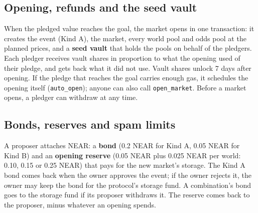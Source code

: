 \documentclass[11pt,a4paper]{article}
\newcommand{\code}[1]{\texttt{\small #1}}
\begin{document}
\subsection{Opening, refunds and the seed vault}

When the pledged value reaches the goal, the market opens in one transaction: it creates the event (Kind A), the
market, every world pool and odds pool at the planned prices, and a \textbf{seed vault} that holds the pools on
behalf of the pledgers. Each pledger receives vault shares in proportion to what the opening used of their pledge,
and gets back what it did not use. Vault shares unlock 7 days after opening. If the pledge that reaches the goal
carries enough gas, it schedules the opening itself (\code{auto\_open}); anyone can also call \code{open\_market}.
Before a market opens, a pledger can withdraw at any time.

\subsection{Bonds, reserves and spam limits}

A proposer attaches NEAR: a \textbf{bond} (0.2 NEAR for Kind A, 0.05 NEAR for Kind B) and an \textbf{opening reserve}
(0.05 NEAR plus 0.025 NEAR per world: 0.10, 0.15 or 0.25 NEAR) that pays for the new market's storage. The Kind A
bond comes back when the owner approves the event; if the owner rejects it, the owner may keep the bond for the
protocol's storage fund. A combination's bond goes to the storage fund if its proposer withdraws it. The reserve
comes back to the proposer, minus whatever an opening spends.
\end{document}
